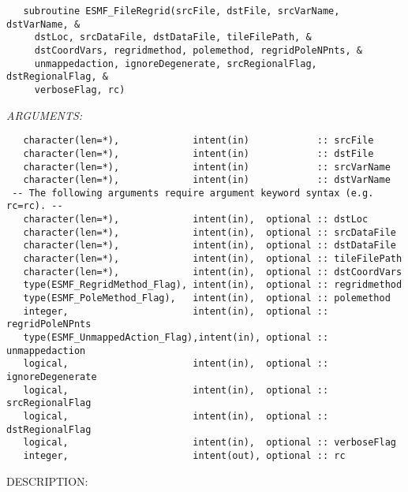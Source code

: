    \label{api:esmf_fileregrid}
\begin{verbatim}   subroutine ESMF_FileRegrid(srcFile, dstFile, srcVarName, dstVarName, &
     dstLoc, srcDataFile, dstDataFile, tileFilePath, &
     dstCoordVars, regridmethod, polemethod, regridPoleNPnts, &
     unmappedaction, ignoreDegenerate, srcRegionalFlag, dstRegionalFlag, &
     verboseFlag, rc)
 \end{verbatim}{\em ARGUMENTS:}
\begin{verbatim} 
   character(len=*),             intent(in)            :: srcFile
   character(len=*),             intent(in)            :: dstFile
   character(len=*),             intent(in)            :: srcVarName
   character(len=*),             intent(in)            :: dstVarName
 -- The following arguments require argument keyword syntax (e.g. rc=rc). --
   character(len=*),             intent(in),  optional :: dstLoc
   character(len=*),             intent(in),  optional :: srcDataFile     
   character(len=*),             intent(in),  optional :: dstDataFile     
   character(len=*),             intent(in),  optional :: tileFilePath
   character(len=*),             intent(in),  optional :: dstCoordVars
   type(ESMF_RegridMethod_Flag), intent(in),  optional :: regridmethod
   type(ESMF_PoleMethod_Flag),   intent(in),  optional :: polemethod
   integer,                      intent(in),  optional :: regridPoleNPnts
   type(ESMF_UnmappedAction_Flag),intent(in), optional :: unmappedaction
   logical,                      intent(in),  optional :: ignoreDegenerate
   logical,                      intent(in),  optional :: srcRegionalFlag
   logical,                      intent(in),  optional :: dstRegionalFlag
   logical,                      intent(in),  optional :: verboseFlag
   integer,                      intent(out), optional :: rc
 \end{verbatim}
{\sf DESCRIPTION:\\ }



